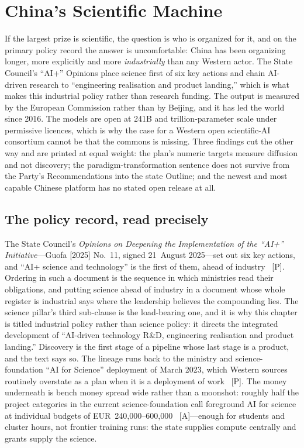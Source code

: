 \chapter{China's Scientific Machine}
\label{c:china-ai4s}

\begin{glance}
If the largest prize is scientific, the question is who is organized for it, and on the primary policy record the answer is uncomfortable: China has been organizing longer, more explicitly and more \emph{industrially} than any Western actor. The State Council's ``AI+'' Opinions place science first of six key actions and chain AI-driven research to ``engineering realisation and product landing,'' which is what makes this industrial policy rather than research funding. The output is measured by the European Commission rather than by Beijing, and it has led the world since 2016. The models are open at 241B and trillion-parameter scale under permissive licences, which is why the case for a Western open scientific-AI consortium cannot be that the commons is missing. Three findings cut the other way and are printed at equal weight: the plan's numeric targets measure diffusion and not discovery; the paradigm-transformation sentence does not survive from the Party's Recommendations into the state Outline; and the newest and most capable Chinese platform has no stated open release at all. 
\end{glance}

\section{The policy record, read precisely}

The State Council's \emph{Opinions on Deepening the Implementation of the ``AI+'' Initiative}---Guofa [2025] No.~11, signed 21~August 2025---set out six key actions, and ``AI+ science and technology'' is the first of them, ahead of industry~\cite{ai-plus-science} [P]. Ordering in such a document is the sequence in which ministries read their obligations, and putting science ahead of industry in a document whose whole register is industrial says where the leadership believes the compounding lies. The science pillar's third sub-clause is the load-bearing one, and it is why this chapter is titled industrial policy rather than science policy: it directs the integrated development of ``AI-driven technology R\&D, engineering realisation and product landing.'' Discovery is the first stage of a pipeline whose last stage is a product, and the text says so. The lineage runs back to the ministry and science-foundation ``AI for Science'' deployment of March 2023, which Western sources routinely overstate as a plan when it is a deployment of work~\cite{most-ai4s} [P]. The money underneath is bench money spread wide rather than a moonshot: roughly half the project categories in the current science-foundation call foreground AI for science at individual budgets of EUR~240{,}000--600{,}000~\cite{nsfc-ai4s} [A]---enough for students and cluster hours, not frontier training runs: the state supplies compute centrally and grants supply the science.

